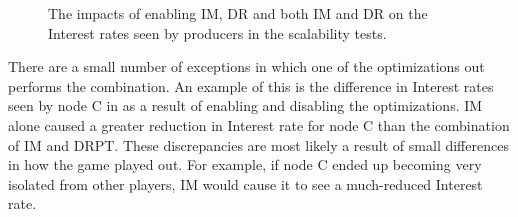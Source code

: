 \begin{figure}[H]
    \centering
    \caption{The impacts of enabling IM, DR and both IM and DR on the Interest rates seen by producers in the scalability tests.}
    \label{fig:eval:im-dr:impacts}
\end{figure}


There are a small number of exceptions in which one of the optimizations out performs the combination. An example of this is the difference in Interest rates seen by node C in  as a result of enabling and disabling the optimizations. IM alone caused a greater reduction in Interest rate for node C than the combination of IM and DRPT. These discrepancies are most likely a result of small differences in how the game played out. For example, if node C ended up becoming very isolated from other players, IM would cause it to see a much-reduced Interest rate. 

